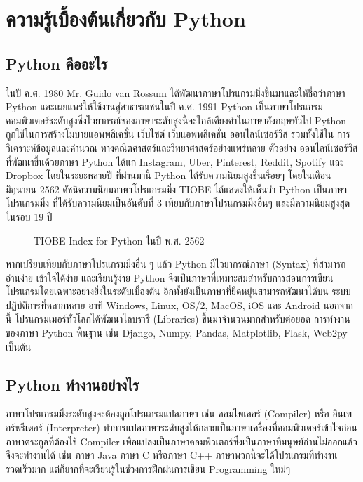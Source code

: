 \chapter{ความรู้เบื้องต้นเกี่ยวกับ Python}

\section{Python คืออะไร}

ในปี ค.ศ. 1980 Mr. Guido van Rossum ได้พัฒนาภาษาโปรแกรมมิ่งขึ้นมาและให้ชื่อว่าภาษา Python และเผยแพร่ให้ใช้งานสู่สาธารณชนในปี ค.ศ. 1991 \cite{Gui19} Python เป็นภาษาโปรแกรมคอมพิวเตอร์ระดับสูงซึ่งไวยากรณ์ของภาษาระดับสูงนี้จะใกล้เคียงคำในภาษาอังกฤษทั่วไป \cite{All15}  Python ถูกใช้ในการสร้างโมบายแอพพลิเคชั่น เว็บไซต์ เว็บแอพพลิเคชั่น ออนไลน์เซอร์วิส รวมทั้งใช้ใน การวิเคราะห์ข้อมูลและคำนวณ ทางคณิตศาสตร์และวิทยาศาสตร์อย่างแพร่หลาย  ตัวอย่าง ออนไลน์เซอร์วิสที่พัฒนาขึ้นด้วยภาษา Python ได้แก่ Instagram, Uber, Pinterest, Reddit, Spotify และ Dropbox \cite{Shu19} โดยในระยะหลายปี ที่ผ่านมานี้ Python ได้รับความนิยมสูงขึ้นเรื่อยๆ โดยในเดือนมิถุนายน 2562 ดัชนีความนิยมภาษาโปรแกรมมิ่ง TIOBE ได้แสดงให้เห็นว่า Python เป็นภาษาโปรแกรมมิ่ง ที่ได้รับความนิยมเป็นอันดับที่ 3 เทียบกับภาษาโปรแกรมมิ่งอื่นๆ และมีความนิยมสูงสุดในรอบ 19 ปี \cite{TIO19}  

\begin{figure}[h]
\caption{TIOBE Index for Python ในปี พ.ศ. 2562}
\end{figure}

หากเปรียบเทียบกับภาษาโปรแกรมมิ่งอื่น ๆ แล้ว Python มีไวยากรณ์ภาษา (Syntax) ที่สามารถอ่านง่าย เข้าใจได้ง่าย และเรียนรู้ง่าย Python จึงเป็นภาษาที่เหมาะสมสำหรับการสอนการเขียนโปรแกรมโดยเฉพาะอย่างยิ่งในระดับเบื้องต้น อีกทั้งยังเป็นภาษาที่ยืดหยุ่นสามารถพัฒนาได้บน ระบบปฏิบัติการที่หลากหลาย อาทิ  Windows, Linux, OS/2, MacOS, iOS และ Android นอกจากนี้ โปรแกรมเมอร์ทั่วโลกได้พัฒนาไลบรารี (Libraries) ขึ้นมาจำนวนมากสำหรับต่อยอด การทำงานของภาษา Python พื้นฐาน เช่น Django, Numpy, Pandas, Matplotlib, Flask, Web2py เป็นต้น \cite{Pyt19}

\section{Python ทำงานอย่างไร}

ภาษาโปรแกรมมิ่งระดับสูงจะต้องถูกโปรแกรมแปลภาษา เช่น คอมไพเลอร์ (Compiler) หรือ อินเทอร์พรีเตอร์ (Interpreter) ทำการแปลภาษาระดับสูงให้กลายเป็นภาษาเครื่องที่คอมพิวเตอร์เข้าใจก่อน \cite{Mar13} ภาษาตระกูลที่ต้องใช้ Compiler เพื่อแปลงเป็นภาษาคอมพิวเตอร์ซึ่งเป็นภาษาที่มนุษย์อ่านไม่ออกแล้วจึงจะทำงานได้ เช่น ภาษา Java ภาษา C หรือภาษา C++ ภาษาพวกนี้จะได้โปรแกรมที่ทำงานรวดเร็วมาก แต่ก็ยากที่จะเรียนรู้ในช่วงการฝึกฝนการเขียน Programming ใหม่ๆ \cite{Pau16}

